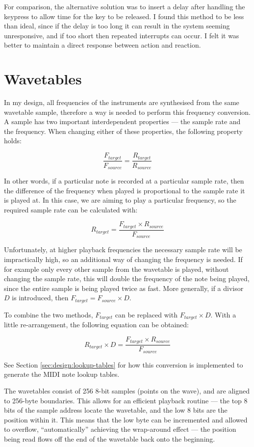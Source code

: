 For comparison, the alternative solution was to insert a delay after handling the keypress to allow 
time for the key to be released.  I found this method to be less than ideal, since if the delay is 
too long it can result in the system seeming unresponsive, and if too short then repeated interrupts 
can occur.  I felt it was better to maintain a direct response between action and reaction.


\section{Wavetables}
\label{sec:design:wavetables}

In my design, all frequencies of the instruments are synthesised from the same wavetable sample, 
therefore a way is needed to perform this frequency conversion.  A sample has two important 
interdependent properties --- the sample rate and the frequency.  When changing either of these 
properties, the following property holds:

\[\frac{F_{target}}{F_{source}} = \frac{R_{target}}{R_{source}}\]

In other words, if a particular note is recorded at a particular sample rate, then the difference of 
the frequency when played is proportional to the sample rate it is played at.  In this case, we are 
aiming to play a particular frequency, so the required sample rate can be calculated with:

\[R_{target} = \frac{F_{target} \times R_{source}}{F_{source}}\]

Unfortunately, at higher playback frequencies the necessary sample rate will be impractically high, 
so an additional way of changing the frequency is needed.  If for example only every other sample 
from the wavetable is played, without changing the sample rate, this will double the frequency of 
the note being played, since the entire sample is being played twice as fast.  More generally, if a 
divisor $D$ is introduced, then $F_{target} = F_{source} \times D$.

To combine the two methods, $F_{target}$ can be replaced with $F_{target} \times D$.  With a little 
re-arrangement, the following equation can be obtained:

\[R_{target} \times D = \frac{F_{target} \times R_{source}}{F_{source}}\]

See Section \ref{sec:design:lookup-tables} for how this conversion is implemented to generate the 
MIDI note lookup tables.

The wavetables consist of 256 8-bit samples (points on the wave), and are aligned to 256-byte 
boundaries.  This allows for an efficient playback routine --- the top 8 bits of the sample address 
locate the wavetable, and the low 8 bits are the position within it.  This means that the low byte 
can be incremented and allowed to overflow, ``automatically'' achieving the wrap-around effect --- 
the position being read flows off the end of the wavetable back onto the beginning.



